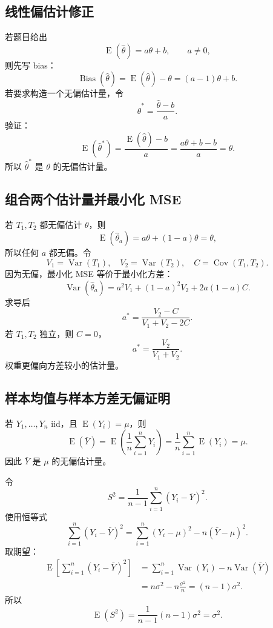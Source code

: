 \documentclass[11pt,a4paper]{article}
\newcommand{\E}{\operatorname{E}}
\newcommand{\Var}{\operatorname{Var}}
\newcommand{\Cov}{\operatorname{Cov}}
\newcommand{\Bias}{\operatorname{Bias}}
\begin{document}
\subsection{线性偏估计修正}

\begin{examplebox}
若题目给出
\[
  \E(\hat\theta)=a\theta+b,\qquad a\ne0,
\]
则先写 bias：
\[
  \Bias(\hat\theta)
  =
  \E(\hat\theta)-\theta
  =
  (a-1)\theta+b.
\]
若要求构造一个无偏估计量，令
\[
  \hat\theta^*=\frac{\hat\theta-b}{a}.
\]
验证：
\[
  \E(\hat\theta^*)
  =
  \frac{\E(\hat\theta)-b}{a}
  =
  \frac{a\theta+b-b}{a}
  =
  \theta.
\]
所以 $\hat\theta^*$ 是 $\theta$ 的无偏估计量。
\end{examplebox}

\subsection{组合两个估计量并最小化 MSE}

\begin{methodbox}[组合两个估计量并优化权重]
若 $T_1,T_2$ 都无偏估计 $\theta$，则
\[
  \E(\hat\theta_a)=a\theta+(1-a)\theta=\theta,
\]
所以任何 $a$ 都无偏。令
\[
  V_1=\Var(T_1),\quad V_2=\Var(T_2),\quad C=\Cov(T_1,T_2).
\]
因为无偏，最小化 MSE 等价于最小化方差：
\[
  \Var(\hat\theta_a)
  =
  a^2V_1+(1-a)^2V_2+2a(1-a)C.
\]
求导后
\[
  \boxed{
  a^*=\frac{V_2-C}{V_1+V_2-2C}
  }.
\]
若 $T_1,T_2$ 独立，则 $C=0$，
\[
  \boxed{
  a^*=\frac{V_2}{V_1+V_2}
  }.
\]
权重更偏向方差较小的估计量。
\end{methodbox}

\subsection{样本均值与样本方差无偏证明}

\begin{proofbox}[证明样本均值无偏]
若 $Y_1,\ldots,Y_n$ iid，且 $\E(Y_i)=\mu$，则
\[
  \E(\bar Y)
  =
  \E\left(\frac1n\sum_{i=1}^nY_i\right)
  =
  \frac1n\sum_{i=1}^n\E(Y_i)
  =
  \mu.
\]
因此 $\bar Y$ 是 $\mu$ 的无偏估计量。
\end{proofbox}

\begin{proofbox}[证明样本方差无偏]
令
\[
  S^2=\frac1{n-1}\sum_{i=1}^n(Y_i-\bar Y)^2.
\]
使用恒等式
\[
  \sum_{i=1}^n(Y_i-\bar Y)^2
  =
  \sum_{i=1}^n(Y_i-\mu)^2-n(\bar Y-\mu)^2.
\]
取期望：
\[
\begin{aligned}
  \E\left[\sum_{i=1}^n(Y_i-\bar Y)^2\right]
  &=
  \sum_{i=1}^n\Var(Y_i)-n\Var(\bar Y)\\
  &=
  n\sigma^2-n\frac{\sigma^2}{n}
  =
  (n-1)\sigma^2.
\end{aligned}
\]
所以
\[
  \E(S^2)
  =
  \frac1{n-1}(n-1)\sigma^2
  =
  \sigma^2.
\]
\end{proofbox}
\end{document}
